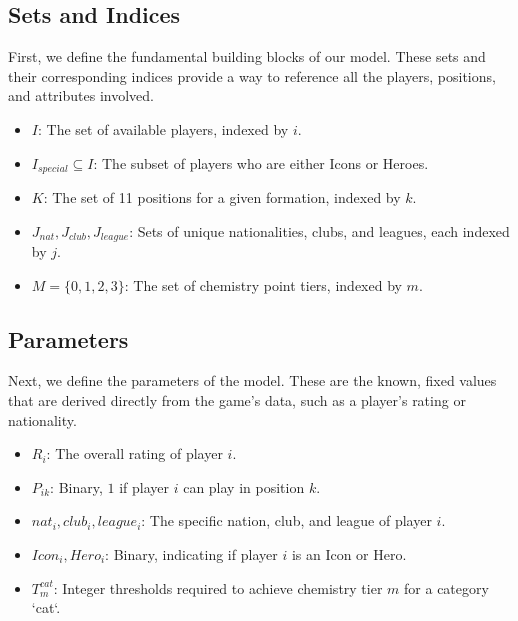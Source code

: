 \documentclass{article}
\begin{document}
\subsection{Sets and Indices}
First, we define the fundamental building blocks of our model. These sets and their corresponding indices provide a way to reference all the players, positions, and attributes involved.
\begin{itemize}
    \item $I$: The set of available players, indexed by $i$.
    \item $I_{special} \subseteq I$: The subset of players who are either Icons or Heroes.
    \item $K$: The set of 11 positions for a given formation, indexed by $k$.
    \item $J_{nat}, J_{club}, J_{league}$: Sets of unique nationalities, clubs, and leagues, each indexed by $j$.
    \item $M = \{0, 1, 2, 3\}$: The set of chemistry point tiers, indexed by $m$.
\end{itemize}

\subsection{Parameters}
Next, we define the parameters of the model. These are the known, fixed values that are derived directly from the game's data, such as a player's rating or nationality.
\begin{itemize}
    \item $R_i$: The overall rating of player $i$.
    \item $P_{ik}$: Binary, $1$ if player $i$ can play in position $k$.
    \item $nat_i, club_i, league_i$: The specific nation, club, and league of player $i$.
    \item $Icon_i, Hero_i$: Binary, indicating if player $i$ is an Icon or Hero.
    \item $T^{cat}_m$: Integer thresholds required to achieve chemistry tier $m$ for a category `cat`.
\end{itemize}
\end{document}
